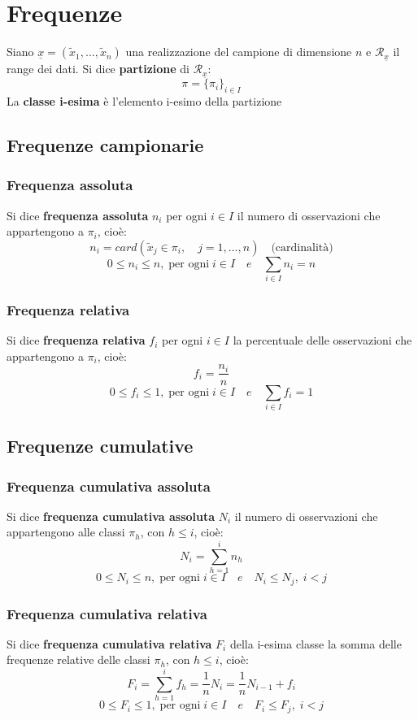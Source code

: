 \documentclass[a4paper]{article}
\theoremstyle{break}
\theoremstyle{break}
\theoremstyle{break}
\theoremstyle{break}
\begin{document}
\section{Frequenze}
Siano \( \underline{x} = (\tilde{x}_1, \ldots, \tilde{x}_n) \) una realizzazione del
campione di dimensione \( n \) e \( \mathcal{R}_{\underline{x}} \) il range dei dati.
Si dice \textbf{partizione} di \( \mathcal{R}_{\underline{x}} \):
\[
	\pi = \{\pi_i\}_{i \in I}
\]
La \textbf{classe i-esima} è l'elemento i-esimo della partizione

\subsection{Frequenze campionarie}
\subsubsection{Frequenza assoluta}
Si dice \textbf{frequenza assoluta} \( n_i \) per ogni \( i \in I \) il numero di
osservazioni che appartengono a \( \pi_i  \), cioè:
\[
	n_i = card(\tilde{x}_j \in \pi_i, \quad j = 1, \ldots, n) \quad \text{(cardinalità)}
\]
\[
	0 \le n_i \le n, \; \text{per ogni}\; i \in I \quad e \quad \sum_{i \in I} n_i = n
\]

\subsubsection{Frequenza relativa}
Si dice \textbf{frequenza relativa} \( f_i \) per ogni \( i \in I \) la percentuale delle
osservazioni che appartengono a \( \pi _i \), cioè:
\[
	f_i = \frac{n_i}{n}
\]
\[
	0 \le f_i \le 1, \; \text{per ogni}\; i \in I \quad e \quad \sum_{i \in I} f_i = 1
\]

\subsection{Frequenze cumulative}
\subsubsection{Frequenza cumulativa assoluta}
Si dice \textbf{frequenza cumulativa assoluta} \( N_i \) il numero di osservazioni che
appartengono alle classi \( \pi_h \), con \( h \le i \), cioè:
\[
	N_i = \sum_{h=1}^{i} n_h
\]
\[
	0 \le N_i \le n, \; \text{per ogni}\; i \in I \quad e \quad N_i \le N_j, \; i<j
\]

\subsubsection{Frequenza cumulativa relativa}
Si dice \textbf{frequenza cumulativa relativa} \( F_i \) della i-esima classe la somma
delle frequenze relative delle classi \( \pi _h \), con \( h \le i \), cioè:
\[
	F_i = \sum_{h=1}^{i} f_h = \frac{1}{n}N_i = \frac{1}{n}N_{i-1} + f_i
\]
\[
	0 \le F_i \le 1, \; \text{per ogni}\; i \in I \quad e \quad F_i \le F_j, \; i<j
\]
\end{document}
